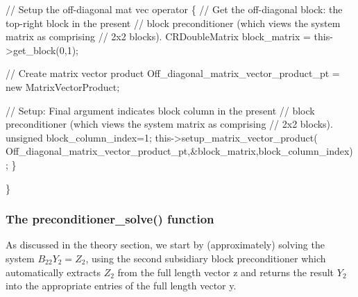 \begin{DoxyCodeInclude}
  \textcolor{comment}{// Setup the off-diagonal mat vec operator}
  \{
   \textcolor{comment}{// Get the off-diagonal block: the top-right block in the present}
   \textcolor{comment}{// block preconditioner (which views the system matrix as comprising}
   \textcolor{comment}{// 2x2 blocks).}
   CRDoubleMatrix block\_matrix = this->get\_block(0,1);
   
   \textcolor{comment}{// Create matrix vector product}
   Off\_diagonal\_matrix\_vector\_product\_pt = \textcolor{keyword}{new} MatrixVectorProduct;
   
   \textcolor{comment}{// Setup: Final argument indicates block column in the present}
   \textcolor{comment}{// block preconditioner (which views the system matrix as comprising}
   \textcolor{comment}{// 2x2 blocks).}
   \textcolor{keywordtype}{unsigned} block\_column\_index=1;
   this->setup\_matrix\_vector\_product(
    Off\_diagonal\_matrix\_vector\_product\_pt,&block\_matrix,block\_column\_index);
  \}
 
 \}

\end{DoxyCodeInclude}
\hypertarget{index_two_plus_three_upper_triangular_with_sub_solve}{}\subsubsection{The preconditioner\+\_\+solve() function}\label{index_two_plus_three_upper_triangular_with_sub_solve}
As discussed in the theory section, we start by (approximately) solving the system $ B_{22} Y_2 = Z_2 $, using the second subsidiary block preconditioner which automatically extracts $ Z_2 $ from the full length vector {\ttfamily z} and returns the result $ Y_2 $ into the appropriate entries of the full length vector {\ttfamily y}.


